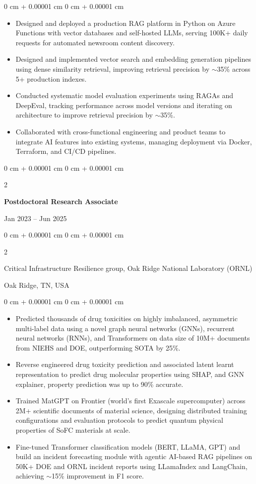 \documentclass[10pt, letterpaper]{article}
\newenvironment{highlights}{
    \begin{itemize}[
        topsep=0.10 cm,
        parsep=0.10 cm,
        partopsep=0pt,
        itemsep=0pt,
        leftmargin=0 cm + 10pt
    ]
}{
    \end{itemize}
} %
\newenvironment{onecolentry}{
    \begin{adjustwidth}{
        0 cm + 0.00001 cm
    }{
        0 cm + 0.00001 cm
    }
}{
    \end{adjustwidth}
} %
\newenvironment{twocolentry}[2][]{
    \onecolentry
    \def\secondColumn{#2}
    \setcolumnwidth{\fill, 4.5 cm}
    \begin{paracol}{2}
}{
    \switchcolumn \raggedleft \secondColumn
    \end{paracol}
    \endonecolentry
} %
\begin{document}
    \begin{onecolentry}
        \begin{highlights}
             \item Designed and deployed a production RAG platform in Python on Azure Functions with vector databases and self-hosted LLMs, serving 100K+ daily requests for automated newsroom content discovery.
            \item Designed and implemented vector search and embedding generation pipelines using dense similarity retrieval, improving retrieval precision by $\sim$35\% across 5+ production indexes.
            \item Conducted systematic model evaluation experiments using RAGAs and DeepEval, tracking performance across model versions and iterating on architecture to improve retrieval precision by $\sim$35\%.
            \item Collaborated with cross-functional engineering and product teams to integrate AI features into existing systems, managing deployment via Docker, Terraform, and CI/CD pipelines.
        \end{highlights}
    \end{onecolentry}

\vspace{1mm}

    \begin{twocolentry}{Jan 2023 -- Jun 2025}
        \textbf{Postdoctoral Research Associate}
    \end{twocolentry}
    \begin{twocolentry}{Oak Ridge, TN, USA}
        Critical Infrastructure Resilience group, Oak Ridge National Laboratory (ORNL)
    \end{twocolentry}
    \vspace{0.10 cm}
    \begin{onecolentry}
        \begin{highlights}
            \item Predicted thousands of drug toxicities on highly imbalanced, asymmetric multi-label data using a novel graph neural networks (GNNs), recurrent neural networks (RNNs), and Transformers on data size of 10M+ documents from NIEHS and DOE, outperforming SOTA by 25\%.
            \item Reverse engineered drug toxicity prediction and associated latent learnt representation to predict drug molecular properties using SHAP, and GNN explainer, property prediction was up to 90\% accurate.
            \item Trained MatGPT on Frontier (world’s first Exascale supercomputer) across 2M+ scientific documents of material science, designing distributed training configurations and evaluation protocols to predict quantum physical properties  of SoFC materials at scale.
            \item Fine-tuned Transformer classification models (BERT, LLaMA, GPT) and build an incident forecasting module with agentic AI-based RAG pipelines on 50K+ DOE and ORNL incident reports using LLamaIndex and LangChain, achieving $\sim$15\% improvement in F1 score.
        \end{highlights}
    \end{onecolentry}
\end{document}
